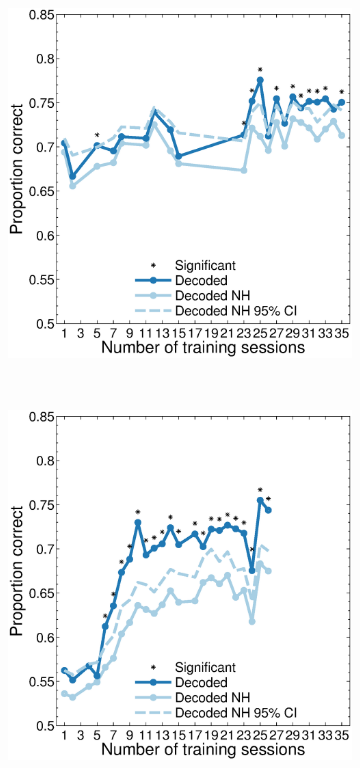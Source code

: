 \begin{figure}[htbp]
    \begin{subfigure}[b]{0.5\linewidth}
        \centering
        \caption{}
        \label{fig:decag_b4_allp}
	\includegraphics[width=\linewidth]{./figures/ncl_decoding/agree_v4_blanco.eps}
    \end{subfigure}
    ~~
    \begin{subfigure}[b]{0.5\linewidth}
        \centering
        \caption{}
        \label{fig:decag_j4_allp}
	\includegraphics[width=\linewidth]{./figures/ncl_decoding/agree_v4_jack.eps}

\end{subfigure}
\end{figure}
